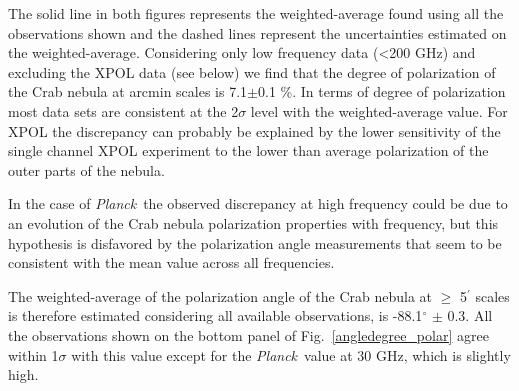 \documentclass[twocolumn,traditabstract]{aa}
\def\Planck{\textit{Planck}}
\begin{document}
The solid line in both figures represents the weighted-average found using all
the observations shown and the dashed lines represent the uncertainties
estimated on the weighted-average. Considering only low frequency data
(\textless 200 GHz) and excluding the XPOL data (see below) we find that the
degree of polarization of the Crab nebula at arcmin scales is 7.1$\pm$0.1 \%.
In terms of degree of polarization most data sets are consistent at the
2$\sigma$ level with the weighted-average value. For XPOL the discrepancy can
probably be explained by the lower sensitivity of the single channel XPOL
experiment to the lower than average polarization of the outer parts of the
nebula.

In the case of \Planck\, the observed discrepancy at high frequency could be due
to an evolution of the Crab nebula polarization properties with frequency, but
this hypothesis is disfavored by the polarization angle measurements that seem
to be consistent with the mean value across all frequencies.

The weighted-average of the polarization angle of the Crab nebula at $\geq$ 5$^{\prime}$ scales is therefore estimated considering all available observations, is -88.1$^{\circ}$
$\pm$ 0.3.  All the observations shown on the bottom panel of
Fig.~\ref{angledegree_polar} agree within 1$\sigma$ with this value except for
the \Planck\ value at 30 GHz, which is slightly high.
\end{document}
